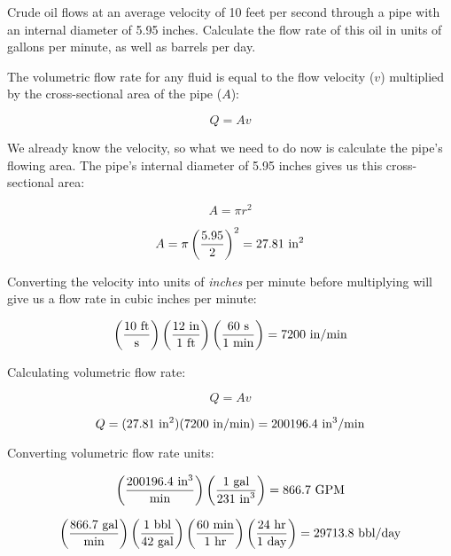 

Crude oil flows at an average velocity of 10 feet per second through a pipe with an internal diameter of 5.95 inches.  Calculate the flow rate of this oil in units of gallons per minute, as well as barrels per day.







The volumetric flow rate for any fluid is equal to the flow velocity ($v$) multiplied by the cross-sectional area of the pipe ($A$):

$$Q = Av$$

We already know the velocity, so what we need to do now is calculate the pipe's flowing area.  The pipe's internal diameter of 5.95 inches gives us this cross-sectional area:

$$A = \pi r^2$$

$$A = \pi \left(5.95 \over 2 \right)^2 = 27.81 \hbox{ in}^2$$

Converting the velocity into units of {\it inches} per minute before multiplying will give us a flow rate in cubic inches per minute:

$$\left( 10 \hbox{ ft} \over \hbox{s} \right) \left(12 \hbox{ in} \over 1 \hbox{ ft} \right) \left( 60 \hbox{ s} \over 1 \hbox{ min} \right) = 7200 \hbox{ in/min}$$

Calculating volumetric flow rate:

$$Q = Av$$

$$Q = (27.81 \hbox{ in}^2) (7200 \hbox{ in/min}) = 200196.4 \hbox{ in}^3\hbox{/min}$$

Converting volumetric flow rate units:

$$\left( 200196.4 \hbox{ in}^3 \over \hbox{min} \right) \left(1 \hbox{ gal} \over 231 \hbox{ in}^3 \right) = 866.7 \hbox{ GPM}$$

$$\left( 866.7 \hbox{ gal} \over \hbox{min} \right) \left(1 \hbox{ bbl} \over 42 \hbox{ gal} \right) \left( 60 \hbox{ min} \over 1 \hbox{ hr} \right)  \left( 24 \hbox{ hr} \over 1 \hbox{ day} \right) = 29713.8 \hbox{ bbl/day}$$



 










